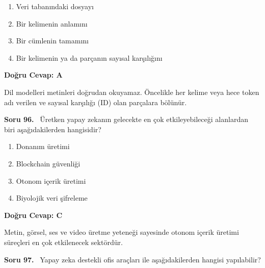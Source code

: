 \documentclass[11pt,a4paper,openany]{book}
\begin{document}
\begin{enumerate}[label=\Alph*), leftmargin=25pt, topsep=4pt, itemsep=2pt]
        \item Veri tabanındaki dosyayı
        \item Bir kelimenin anlamını
        \item Bir cümlenin tamamını
        \item Bir kelimenin ya da parçanın sayısal karşılığını
\end{enumerate}

\vspace{4pt}
\begin{tcolorbox}[title=Cevap ve Açıklama, colback=gray!3!white, colframe=primarycolor!90!black, arc=2mm, fonttitle=\bfseries\sffamily, top=6pt, bottom=6pt]
    \textbf{Doğru Cevap: A}

    \vspace{2pt}
    Dil modelleri metinleri doğrudan okuyamaz. Öncelikle her kelime veya hece token adı verilen ve sayısal karşılığı (ID) olan parçalara bölünür.
\end{tcolorbox}
\vspace{10pt}
\needspace{5cm}
\vspace{8pt}
\noindent\textbf{\large\sffamily Soru 96.} \ Üretken yapay zekanın gelecekte en çok etkileyebileceği alanlardan biri aşağıdakilerden hangisidir?

\begin{enumerate}[label=\Alph*), leftmargin=25pt, topsep=4pt, itemsep=2pt]
        \item Donanım üretimi
        \item Blockchain güvenliği
        \item Otonom içerik üretimi
        \item Biyolojik veri şifreleme
\end{enumerate}

\vspace{4pt}
\begin{tcolorbox}[title=Cevap ve Açıklama, colback=gray!3!white, colframe=primarycolor!90!black, arc=2mm, fonttitle=\bfseries\sffamily, top=6pt, bottom=6pt]
    \textbf{Doğru Cevap: C}

    \vspace{2pt}
    Metin, görsel, ses ve video üretme yeteneği sayesinde otonom içerik üretimi süreçleri en çok etkilenecek sektördür.
\end{tcolorbox}
\vspace{10pt}
\needspace{5cm}
\vspace{8pt}
\noindent\textbf{\large\sffamily Soru 97.} \ Yapay zeka destekli ofis araçları ile aşağıdakilerden hangisi yapılabilir?
\end{document}
